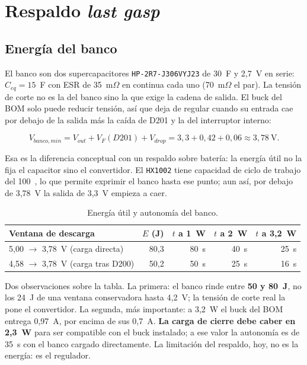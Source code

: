 \documentclass[11pt,a4paper]{article}
\newcommand{\pct}{\text{\char37}}
\begin{document}
\section{Respaldo \emph{last gasp}}
\label{sec:respaldo}

\subsection{Energía del banco}

El banco son dos supercapacitores \texttt{HP-2R7-J306VYJ23} de 30~F y 2,7~V en
serie: $C_{eq} = 15$~F con ESR de 35~m$\Omega$ en continua cada uno
(70~m$\Omega$ el par). La tensión de corte no es la del banco sino la que exige
la cadena de salida. El buck del BOM solo puede reducir tensión, así que deja de
regular cuando su entrada cae por debajo de la salida más la caída de D201 y la
del interruptor interno:

\begin{equation}
V_{banco,min} = V_{out} + V_F(D201) + V_{drop}
= 3{,}3 + 0{,}42 + 0{,}06 \approx 3{,}78~\mathrm{V}.
\end{equation}

\noindent Esa es la diferencia conceptual con un respaldo sobre batería: la
energía útil no la fija el capacitor sino el convertidor. El \texttt{HX1002}
tiene capacidad de ciclo de trabajo del 100~\pct{}, lo que permite exprimir el
banco hasta ese punto; aun así, por debajo de 3,78~V la salida de 3,3~V empieza
a caer.

\begin{table}[H]
\centering
\caption{Energía útil y autonomía del banco.}
\label{tab:energia}
\small
\begin{tabularx}{\textwidth}{@{}X r r r r@{}}
\toprule
\textbf{Ventana de descarga} & \textbf{$E$ (J)} & \textbf{$t$ a 1~W} & \textbf{$t$ a 2~W} & \textbf{$t$ a 3,2~W} \\
\midrule
5,00 $\to$ 3,78~V (carga directa) & 80,3 & 80~s & 40~s & 25~s \\
4,58 $\to$ 3,78~V (carga tras D200) & 50,2 & 50~s & 25~s & 16~s \\
\bottomrule
\end{tabularx}
\end{table}

\noindent Dos observaciones sobre la tabla. La primera: el banco rinde entre
\textbf{50 y 80~J}, no los 24~J de una ventana conservadora hasta 4,2~V; la
tensión de corte real la pone el convertidor. La segunda, más importante: a
3,2~W el buck del BOM entrega 0,97~A, por encima de sus 0,7~A. \textbf{La carga
de cierre debe caber en 2,3~W} para ser compatible con el buck instalado; a ese
valor la autonomía es de 35~s con el banco cargado directamente. La limitación
del respaldo, hoy, no es la energía: es el regulador.
\end{document}

